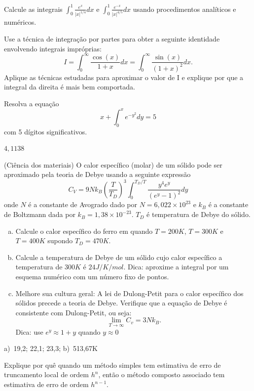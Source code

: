\begin{exer}Calcule as integrais $\int_0^{1}\frac{e^x}{|x|^{1/4}}dx$ e $\int_0^1\frac{e^{-x}}{|x|^{4/5}}dx$ usando procedimentos analíticos e numéricos.
\end{exer}

\begin{exer} Use a técnica de integração por partes para obter a seguinte identidade envolvendo integrais impróprias:
$$I=\int_0^\infty \frac{\cos(x)}{1+x}dx =\int_0^\infty \frac{\sin(x)}{(1+x)^2}dx.$$
Aplique as técnicas estudadas para aproximar o valor de I e explique por que a integral da direita é mais bem comportada.
\end{exer}

\begin{exer} Resolva a  equação
$$x+\int_0^x e^{-y^2}dy=5$$
com 5 dígitos significativos.
\end{exer}
\begin{resp}
  $4,1138$
\end{resp}

\begin{exer}(Ciência dos materiais) O calor específico (molar) de um sólido pode ser aproximado pela teoria de Debye usando a seguinte expressão
$$C_V=9Nk_B\left(\frac{T}{T_D}\right)^3\int_0^{T_D/T} \frac{y^4e^y}{(e^y-1)^2}dy$$
onde $N$ é a constante de Avogrado dado por $N=6,022\times 10^{23}$ e $k_B$ é a constante de Boltzmann dada por $k_B=1,38\times 10^{-23}$. $T_D$ é temperatura de Debye do sólido.
\begin{enumerate}[a)]
\item Calcule o calor específico do ferro em quando $T=200K$, $T=300K$ e $T=400K$ supondo $T_D=470K$.
\item Calcule a temperatura de Debye de um sólido cujo calor específico a temperatura de $300K$ é $24J/K/mol$. Dica: aproxime a integral por um esquema numérico com um número fixo de pontos.
\item Melhore sua cultura geral: A lei de Dulong-Petit para o calor específico dos sólidos precede a teoria de Debye. Verifique que a equação de Debye é consistente com Dulong-Petit, ou seja: $$\lim_{T\to \infty}C_v=3Nk_B.$$ Dica: use $e^y\approx 1+y$ quando $y\approx 0$
\end{enumerate}
\end{exer}
\begin{resp}
  a)~19,2; 22,1; 23,3; b)~513,67K
\end{resp}

\begin{exer} Explique por quê quando um método simples tem estimativa de erro de truncamento local de ordem $h^n$, então o método composto associado tem estimativa de erro de ordem $h^{n-1}$.
\end{exer}

